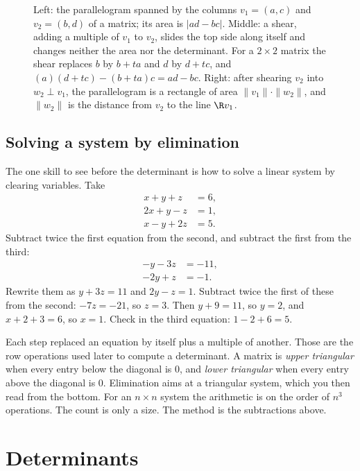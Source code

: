 \begin{figure}[ht]
\centering
{}
\caption{Left: the parallelogram spanned by the columns $v_1=(a,c)$ and $v_2=(b,d)$ of a matrix; its area is $|ad-bc|$. Middle: a shear, adding a multiple of $v_1$ to $v_2$, slides the top side along itself and changes neither the area nor the determinant. For a $2\times2$ matrix the shear replaces $b$ by $b+ta$ and $d$ by $d+tc$, and $(a)(d+tc)-(b+ta)c=ad-bc$. Right: after shearing $v_2$ into $w_2\perp v_1$, the parallelogram is a rectangle of area $\|v_1\|\cdot\|w_2\|$, and $\|w_2\|$ is the distance from $v_2$ to the line $\R v_1$.}
\label{fig:parallelogram}
\end{figure}


\subsection*{Solving a system by elimination}

The one skill to see before the determinant is how to solve a linear system by clearing variables. Take
\begin{align*}
x+y+z&=6,\\
2x+y-z&=1,\\
x-y+2z&=5.
\end{align*}
Subtract twice the first equation from the second, and subtract the first from the third:
\begin{align*}
-y-3z&=-11,\\
-2y+z&=-1.
\end{align*}
Rewrite them as $y+3z=11$ and $2y-z=1$. Subtract twice the first of these from the second: $-7z=-21$, so $z=3$. Then $y+9=11$, so $y=2$, and $x+2+3=6$, so $x=1$. Check in the third equation: $1-2+6=5$.

Each step replaced an equation by itself plus a multiple of another. Those are the row operations used later to compute a determinant. A matrix is \emph{upper triangular} when every entry below the diagonal is $0$, and \emph{lower triangular} when every entry above the diagonal is $0$. Elimination aims at a triangular system, which you then read from the bottom. For an $n\times n$ system the arithmetic is on the order of $n^3$ operations. The count is only a size. The method is the subtractions above.

\section{Determinants}

